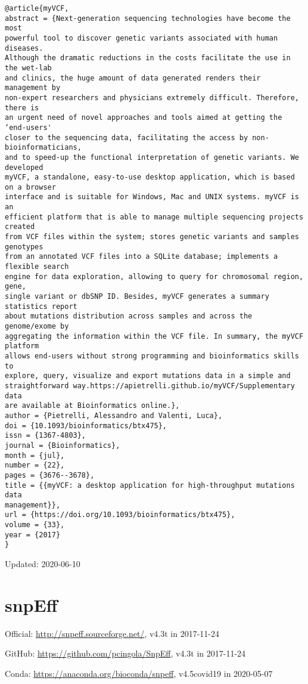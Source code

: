 \documentclass[]{article}
\begin{document}
\begin{verbatim}
@article{myVCF,
abstract = {Next-generation sequencing technologies have become the most
powerful tool to discover genetic variants associated with human diseases.
Although the dramatic reductions in the costs facilitate the use in the wet-lab
and clinics, the huge amount of data generated renders their management by
non-expert researchers and physicians extremely difficult. Therefore, there is
an urgent need of novel approaches and tools aimed at getting the ‘end-users'
closer to the sequencing data, facilitating the access by non-bioinformaticians,
and to speed-up the functional interpretation of genetic variants. We developed
myVCF, a standalone, easy-to-use desktop application, which is based on a browser
interface and is suitable for Windows, Mac and UNIX systems. myVCF is an
efficient platform that is able to manage multiple sequencing projects created
from VCF files within the system; stores genetic variants and samples genotypes
from an annotated VCF files into a SQLite database; implements a flexible search
engine for data exploration, allowing to query for chromosomal region, gene,
single variant or dbSNP ID. Besides, myVCF generates a summary statistics report
about mutations distribution across samples and across the genome/exome by
aggregating the information within the VCF file. In summary, the myVCF platform
allows end-users without strong programming and bioinformatics skills to
explore, query, visualize and export mutations data in a simple and
straightforward way.https://apietrelli.github.io/myVCF/Supplementary data
are available at Bioinformatics online.},
author = {Pietrelli, Alessandro and Valenti, Luca},
doi = {10.1093/bioinformatics/btx475},
issn = {1367-4803},
journal = {Bioinformatics},
month = {jul},
number = {22},
pages = {3676--3678},
title = {{myVCF: a desktop application for high-throughput mutations data
management}},
url = {https://doi.org/10.1093/bioinformatics/btx475},
volume = {33},
year = {2017}
}
\end{verbatim}

Updated: 2020-06-10
\section{snpEff}

Official: \url{http://snpeff.sourceforge.net/}, v4.3t in 2017-11-24

GitHub: \url{https://github.com/pcingola/SnpEff}, v4.3t in 2017-11-24

Conda: \url{https://anaconda.org/bioconda/snpeff}, v4.5covid19 in 2020-05-07
\end{document}
